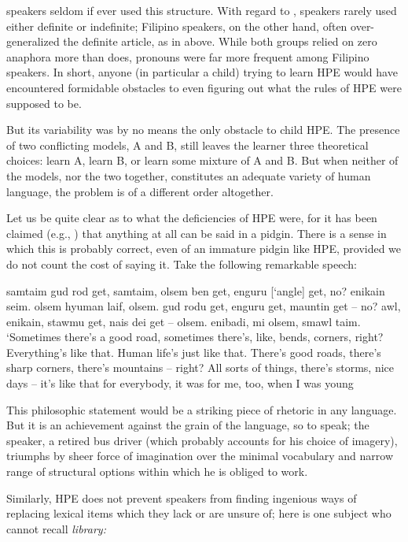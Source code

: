 \noindent {} speakers seldom if ever used this structure. With regard to ,  speakers rarely used either definite or indefinite; Filipino speakers, on the other hand, often over-generalized the definite article, as in  above. While both groups relied on zero anaphora more than  does, pronouns were far more frequent among Filipino speakers. In short, anyone (in particular a child) trying to learn HPE would have encountered formidable obstacles to even figuring out what the rules of HPE were supposed to be.

But its variability was by no means the only obstacle to child  HPE. The presence of two conflicting models, A and B, still leaves the learner three theoretical choices: learn A, learn B, or learn some mixture of A and B. But when neither of the models, nor the two together, constitutes an adequate variety of human language, the problem is of a different order altogether.

Let us be quite clear as to what the deficiencies of HPE were, for it has been claimed (e.g., \citealt{Samarin1971}) that anything at all can be said in a pidgin. There is a sense in which this is probably correct, even of an immature pidgin like HPE, provided we do not count the cost of saying it. Take the following remarkable speech:

\ea\label{ex:12}
 samtaim gud rod get, samtaim, olsem ben get, enguru [`angle] get, no? enikain seim. olsem hyuman laif, olsem. gud rodu get, enguru get, mauntin get -- no? awl, enikain, stawmu get, nais dei get -- olsem. enibadi, mi olsem, smawl taim.
\glt  `Sometimes there's a good road, sometimes there's, like, bends, corners, right? Everything's like that. Human life's just like that. There's good roads, there's sharp corners, there's mountains -- right? All sorts of things, there's storms, nice days -- it's like that for everybody, it was for me, too, when I was young
\z

\noindent This philosophic statement would be a striking piece of rhetoric in any language. But it is an achievement against the grain of the language, so to speak; the speaker, a retired bus driver (which probably accounts for his choice of imagery), triumphs by sheer force of imagination over
the minimal vocabulary and narrow range of structural options within which he is obliged to work.

Similarly, HPE does not prevent speakers from finding ingenious ways of replacing lexical items which they lack or are unsure of; here is one subject who cannot recall \textit{library:}


